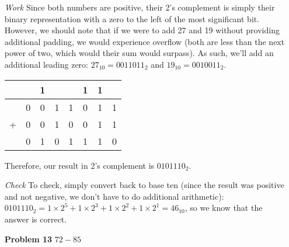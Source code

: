 \documentclass[12pt]{article}
\begin{document}
\begin{enumerate}
  \item[\textit{Work}] Since both numbers are positive, their 2's complement is simply their binary representation with a zero to the left of the most significant bit. However, we should note that if we were to add 27 and 19 without providing additional padding, we would experience overflow (both are less than the next power of two, which would their sum would surpass). As such, we'll add an additional leading zero: $27_{10} = 0011011_2$ and $19_{10} = 0010011_2$.
  \item[]
  \begin{center}
    \begin{tabular}{c@{\,}c@{\,}c@{\,}c@{\,}c@{\,}c@{\,}c@{\,}c}
      &   & 1 &   &   & 1 & 1 &   \\    \hline
      & 0 & 0 & 1 & 1 & 0 & 1 & 1 \\
    + & 0 & 0 & 1 & 0 & 0 & 1 & 1 \\    \hline
      & 0 & 1 & 0 & 1 & 1 & 1 & 0
    \end{tabular}
  \end{center}
  \item[] Therefore, our result in 2's complement is $0101110_2$.
  \item[\textit{Check}] To check, simply convert back to base ten (since the result was positive and not negative, we don't have to do additional arithmetic): $0101110_2 = 1\times2^5+1\times2^3+1\times2^2+1\times2^1=46_{10}$, so we know that the answer is correct.
\end{enumerate}


\begin{enumerate}
  \item[\textbf{Problem 13}] $72-85$
\end{enumerate}
\end{document}
